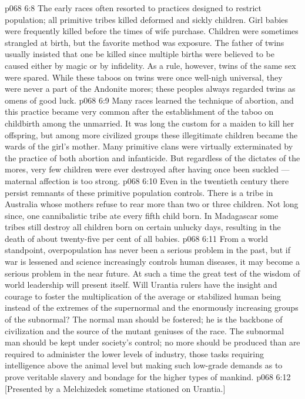 \vs p068 6:8 The early races often resorted to practices designed to restrict population; all primitive tribes killed deformed and sickly children. Girl babies were frequently killed before the times of wife purchase. Children were sometimes strangled at birth, but the favorite method was exposure. The father of twins usually insisted that one be killed since multiple births were believed to be caused either by magic or by infidelity. As a rule, however, twins of the same sex were spared. While these taboos on twins were once well\hyp{}nigh universal, they were never a part of the Andonite mores; these peoples always regarded twins as omens of good luck.
\vs p068 6:9 Many races learned the technique of abortion, and this practice became very common after the establishment of the taboo on childbirth among the unmarried. It was long the custom for a maiden to kill her offspring, but among more civilized groups these illegitimate children became the wards of the girl’s mother. Many primitive clans were virtually exterminated by the practice of both abortion and infanticide. But regardless of the dictates of the mores, very few children were ever destroyed after having once been suckled --- maternal affection is too strong.
\vs p068 6:10 Even in the twentieth century there persist remnants of these primitive population controls. There is a tribe in Australia whose mothers refuse to rear more than two or three children. Not long since, one cannibalistic tribe ate every fifth child born. In Madagascar some tribes still destroy all children born on certain unlucky days, resulting in the death of about twenty\hyp{}five per cent of all babies.
\vs p068 6:11 \pc From a world standpoint, overpopulation has never been a serious problem in the past, but if war is lessened and science increasingly controls human diseases, it may become a serious problem in the near future. At such a time the great test of the wisdom of world leadership will present itself. Will Urantia rulers have the insight and courage to foster the multiplication of the average or stabilized human being instead of the extremes of the supernormal and the enormously increasing groups of the subnormal? The normal man should be fostered; he is the backbone of civilization and the source of the mutant geniuses of the race. The subnormal man should be kept under society’s control; no more should be produced than are required to administer the lower levels of industry, those tasks requiring intelligence above the animal level but making such low\hyp{}grade demands as to prove veritable slavery and bondage for the higher types of mankind.
\vsetoff
\vs p068 6:12 [Presented by a Melchizedek sometime stationed on Urantia.]
